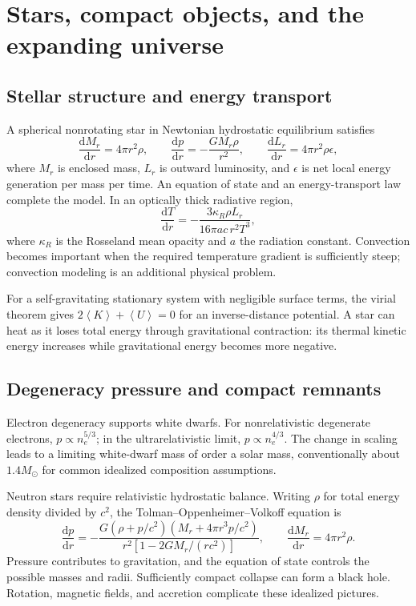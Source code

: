 \documentclass[11pt,oneside]{book}
\newcommand{\dd}{\mathrm{d}}
\newcommand{\avg}[1]{\left\langle #1\right\rangle}
\newcommand{\od}[2]{\frac{\dd #1}{\dd #2}}
\theoremstyle{reviewstyle}
\begin{document}
\chapter{Stars, compact objects, and the expanding universe}
\section{Stellar structure and energy transport}
A spherical nonrotating star in Newtonian hydrostatic equilibrium satisfies
\begin{equation}\od{M_r}{r}=4\pi r^2\rho,\qquad \od{p}{r}=-\frac{GM_r\rho}{r^2},\qquad \od{L_r}{r}=4\pi r^2\rho\epsilon,\end{equation}
where $M_r$ is enclosed mass, $L_r$ is outward luminosity, and $\epsilon$ is net local energy generation per mass per time. An equation of state and an energy-transport law complete the model. In an optically thick radiative region,
\begin{equation}\od{T}{r}=-\frac{3\kappa_R\rho L_r}{16\pi ac\,r^2T^3},\end{equation}
where $\kappa_R$ is the Rosseland mean opacity and $a$ the radiation constant. Convection becomes important when the required temperature gradient is sufficiently steep; convection modeling is an additional physical problem.

For a self-gravitating stationary system with negligible surface terms, the virial theorem gives $2\avg K+\avg U=0$ for an inverse-distance potential. A star can heat as it loses total energy through gravitational contraction: its thermal kinetic energy increases while gravitational energy becomes more negative.
\section{Degeneracy pressure and compact remnants}
Electron degeneracy supports white dwarfs. For nonrelativistic degenerate electrons, $p\propto n_e^{5/3}$; in the ultrarelativistic limit, $p\propto n_e^{4/3}$. The change in scaling leads to a limiting white-dwarf mass of order a solar mass, conventionally about $1.4M_\odot$ for common idealized composition assumptions.

Neutron stars require relativistic hydrostatic balance. Writing $\rho$ for total energy density divided by $c^2$, the Tolman--Oppenheimer--Volkoff equation is
\begin{equation}
\od{p}{r}=-\frac{G(\rho+p/c^2)(M_r+4\pi r^3p/c^2)}{r^2[1-2GM_r/(rc^2)]},\qquad
\od{M_r}{r}=4\pi r^2\rho.
\end{equation}
Pressure contributes to gravitation, and the equation of state controls the possible masses and radii. Sufficiently compact collapse can form a black hole. Rotation, magnetic fields, and accretion complicate these idealized pictures.
\end{document}

